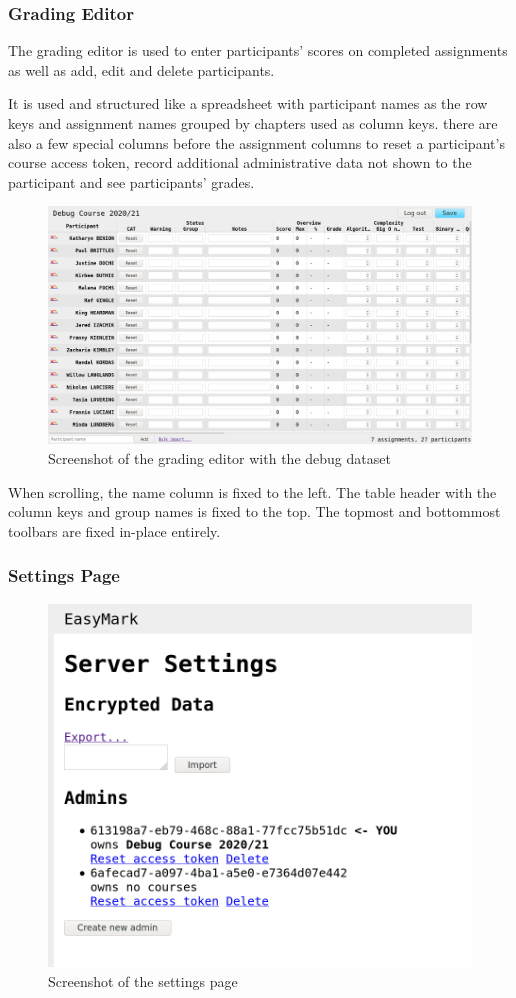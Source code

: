\documentclass[12pt,a4paper,oneside]{report}
\begin{document}
	\subsubsection{Grading Editor}
	The grading editor is used to enter participants' scores on completed assignments as well as add, edit and delete participants.

	It is used and structured like a spreadsheet with participant names as the row keys and assignment names grouped by chapters used as column keys. there are also a few special columns before the assignment columns to reset a participant's course access token, record additional administrative data not shown to the participant and see participants' grades.

	\begin{figure}[h]
		\includegraphics[width=\textwidth]{easymark_grading_editor.png}
		\vskip0pt
		\caption{Screenshot of the grading editor with the debug dataset}
	\end{figure}

	When scrolling, the name column is fixed to the left. The table header with the column keys and group names is fixed to the top. The topmost and bottommost toolbars are fixed in-place entirely.

	\subsubsection{Settings Page}
	\begin{figure}
		\vskip-15pt
		\centering
		\includegraphics[width=.475\textwidth,trim=0 1cm 0 0,clip]{easymark_settings.png}
		\vskip0pt
		\caption{Screenshot of the settings page}
	\end{figure}
\end{document}
